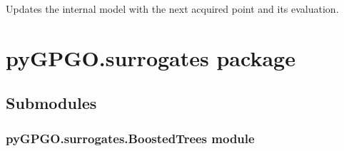 \documentclass[letterpaper,10pt,english]{sphinxmanual}
\begin{document}
\begin{fulllineitems}
\begin{fulllineitems}
\begin{quote}
\begin{description}
\begin{itemize}
\end{itemize}

\end{description}\end{quote}

\end{fulllineitems}


\begin{fulllineitems}
\label{pyGPGO.GPGO:pyGPGO.GPGO.GPGO.updateGP}
Updates the internal model with the next acquired point and its evaluation.

\end{fulllineitems}


\end{fulllineitems}



\section{pyGPGO.surrogates package}
\label{pyGPGO.surrogates:pygpgo-surrogates-package}\label{pyGPGO.surrogates::doc}

\subsection{Submodules}
\label{pyGPGO.surrogates:submodules}

\subsubsection{pyGPGO.surrogates.BoostedTrees module}
\label{pyGPGO.surrogates.BoostedTrees:pygpgo-surrogates-boostedtrees-module}\label{pyGPGO.surrogates.BoostedTrees:module-pyGPGO.surrogates.BoostedTrees}\label{pyGPGO.surrogates.BoostedTrees::doc}
\end{document}
